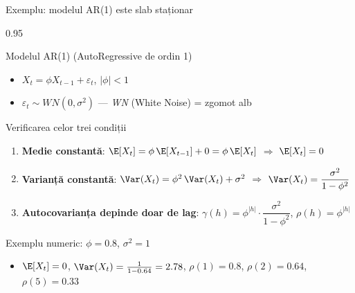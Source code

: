 \documentclass[9pt, aspectratio=169, t]{beamer}
\begin{document}
\begin{frame}{Exemplu: modelul AR(1) este slab staționar}
    \begin{cminipage}{0.95\textwidth}
        \vspace{-0.2cm}
        {\footnotesize
        \begin{exampleblock}{Modelul AR(1) (AutoRegressive de ordin 1)}
            \begin{itemize}\setlength{\itemsep}{0pt}
                \item $X_t = \phi X_{t-1} + \varepsilon_t$, \quad $|\phi| < 1$
                \item $\varepsilon_t \sim WN(0, \sigma^2)$ --- \textit{WN} (White Noise) = zgomot alb
            \end{itemize}
        \end{exampleblock}
        \vspace{-2mm}
        \begin{block}{Verificarea celor trei condiții}
            \begin{enumerate}\setlength{\itemsep}{1pt}
                \item \textbf{Medie constantă}: $\E[X_t] = \phi\,\E[X_{t-1}] + 0 = \phi\,\E[X_t]$ \;\; $\Rightarrow$ \;\; $\E[X_t] = 0$
                \item \textbf{Varianță constantă}: $\Var(X_t) = \phi^2\,\Var(X_t) + \sigma^2$ \;\; $\Rightarrow$ \;\; $\Var(X_t) = \dfrac{\sigma^2}{1 - \phi^2}$
                \item \textbf{Autocovarianța depinde doar de lag}:
                    $\gamma(h) = \phi^{|h|} \cdot \dfrac{\sigma^2}{1 - \phi^2}$, \quad
                    $\rho(h) = \phi^{|h|}$
            \end{enumerate}
        \end{block}
        \vspace{-2mm}
        \begin{exampleblock}{Exemplu numeric: $\phi = 0.8$, $\sigma^2 = 1$}
            \begin{itemize}\setlength{\itemsep}{0pt}
                \item $\E[X_t] = 0$, \quad $\Var(X_t) = \frac{1}{1-0.64} = 2.78$, \quad $\rho(1) = 0.8$, \; $\rho(2) = 0.64$, \; $\rho(5) = 0.33$
            \end{itemize}
        \end{exampleblock}
        }
    \end{cminipage}
\end{frame}
\end{document}
